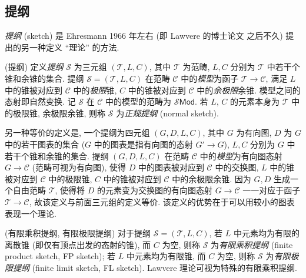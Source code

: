 \subsection{提纲}

\emph{提纲} (sketch) 是 Ehresmann 1966 年左右 (即 Lawvere 的博士论文 \cite{FSAT} 之后不久) 提出的另一种定义 ``理论'' 的方法.

\begin{definition}
	[label={sketches}]
	{(提纲)}
	定义\emph{提纲} $\mathscr S$ 为三元组 $(\mathcal T,L,C)$, 其中 $\mathcal T$ 为范畴, $L,C$ 分别为 $\mathcal T$ 中若干个锥和余锥的集合.
	提纲 $\mathscr S=(\mathcal T,L,C)$ 在范畴 $\mathcal C$ 中的\emph{模型}为函子 $\mathcal T\to\mathcal C$, 满足 $L$ 中的锥被对应到 $\mathcal C$ 中的\emph{极限}锥, $C$ 中的锥被对应到 $\mathcal C$ 中的\emph{余极限}余锥. 模型之间的态射即自然变换. 记 $\mathscr S$ 在 $\mathcal C$ 中的模型的范畴为 $\mathscr S\mathsf {Mod}$.
	若 $L$, $C$ 的元素本身为 $\mathcal T$ 中的极限锥, 余极限余锥, 则称 $\mathscr S$ 为\emph{正规提纲} (normal sketch).
	
	{\small 另一种等价的定义是, 一个提纲为四元组 $(G,D,L,C)$, 其中 $G$ 为有向图, $D$ 为 $G$ 中的若干图表的集合 ($G$ 中的图表是指有向图的态射 $G'\to G$), $L,C$ 分别为 $G$ 中若干个锥和余锥的集合.
	提纲 $(G,D,L,C)$ 在范畴 $\mathcal C$ 中的\emph{模型}为有向图态射 $G\to\mathcal C$ (范畴可视为有向图), 使得 $D$ 中的图表被对应到 $\mathcal C$ 中的交换图, $L$ 中的锥被对应到 $\mathcal C$ 中的极限锥, $C$ 中的锥被对应到 $\mathcal C$ 中的余极限余锥. 因为 $G,D$ 生成一个自由范畴 $\mathcal T$, 使得将 $D$ 的元素变为交换图的有向图态射 $G\to \mathcal C$ 一一对应于函子 $\mathcal T\to \mathcal C$, 故该定义与前面三元组的定义等价. 该定义的优势在于可以用较小的图表表现一个理论.}
\end{definition}



\begin{definition}
	{(有限乘积提纲, 有限极限提纲)}
	对于提纲 $\mathscr S=(\mathcal T,L,C)$, 若 $L$ 中元素均为有限的离散锥 (即仅有顶点出发的态射的锥), 而 $C$ 为空, 则称 $\mathscr S$ 为\emph{有限乘积提纲} (finite product sketch, FP sketch); 若 $L$ 中元素均为有限锥, 而 $C$ 为空, 则称 $\mathscr S$ 为\emph{有限极限提纲} (finite limit sketch, FL sketch). Lawvere 理论可视为特殊的有限乘积提纲.
\end{definition}

